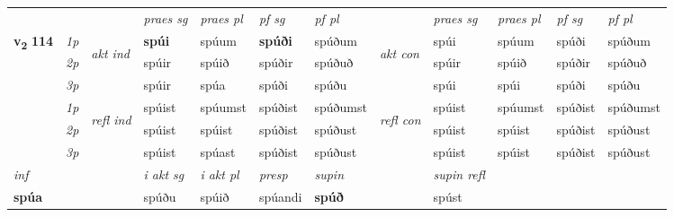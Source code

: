 \begin{longtable}[l]{X>{\footnotesize\itshape}llXXXXlXXXX}
\midrule

 & &   & \textit{praes sg}  & \textit{praes pl}    & \textit{ pf sg} & \textit{pf pl} & & \textit{praes sg}  & \textit{praes pl}    & \textit{pf sg} & \textit{pf pl }  \\ \cmidrule{4-7} \cmidrule{9-12}
 \multirow{2}{*}{{{\textbf{v{\textsubscript{2}}} \Large{\textbf{114}}}}}  & 1p & \multirow{3}{*}{\begin{turn}{90}\textit{akt ind}\end{turn}} & \textbf{spúi} & spúum & \textbf{spúði} & spúðum & \multirow{3}{*}{\begin{turn}{90}\textit{akt con}\end{turn}} &spúi & spúum & spúði & spúðum\\*
 & 2p &  &  spúir  & spúið & spúðir & spúðuð & & spúir & spúið & spúðir & spúðuð \\*
 & 3p &  & spúir & spúa & spúði & spúðu & & spúi & spúi& spúði & spúðu \\*
\cmidrule{4-7} \cmidrule{9-12}
 & 1p & \multirow{3}{*}{\begin{turn}{90}\textit{refl ind}\end{turn}}  & spúist & spúumst & spúðist & spúðumst & \multirow{3}{*}{\begin{turn}{90}\textit{refl con}\end{turn}}  &spúist & spúumst & spúðist & spúðumst \\*
 & 2p &  & spúist & spúist & spúðist & spúðust & &spúist & spúist & spúðist & spúðust \\*
 & 3p  & & spúist & spúast & spúðist & spúðust & & spúist & spúist& spúðist & spúðust \\*
\cmidrule{4-7} \cmidrule{9-12}

   {\textit{inf}} & &  & \textit{i akt sg} & \textit{i akt pl}   & \textit{presp} & \textit{supin} && \textit{supin refl}  \\*
  {\textbf{spúa}} & && spúðu  & spúið   & spúandi &  \textbf{spúð} && spúst  \\*

\midrule


\end{longtable}
